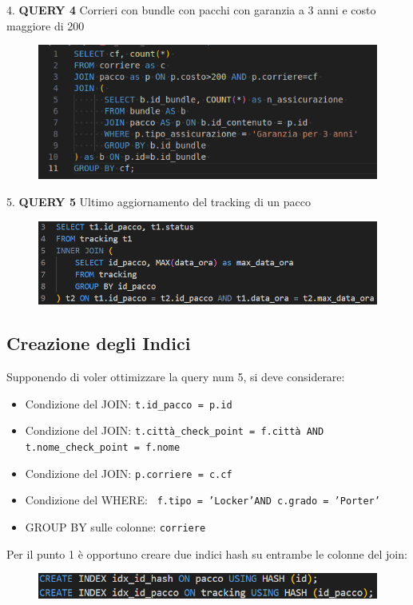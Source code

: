 4. \textbf{QUERY 4} Corrieri con bundle con pacchi con garanzia a 3 anni e costo maggiore di 200
\begin{figure}[H]
\centering
\includegraphics[width=0.7 \textwidth]{Resources/QUERY4.png}
\label{Q4}
\end{figure} 
5. \textbf{QUERY 5} Ultimo aggiornamento del tracking di un pacco
\begin{figure}[H]
\centering
\includegraphics[width=0.7 \textwidth]{Resources/QUERY5.png}
\label{Q5}
\end{figure}

\subsection{Creazione degli Indici} 

Supponendo di voler ottimizzare la query num 5, si deve considerare:

\begin{itemize}
  \item Condizione del JOIN: \texttt{t.id\_pacco = p.id}
  \item Condizione del JOIN: \texttt{t.città\_check\_point = f.città AND t.nome\_check\_point = f.nome}
  \item Condizione del JOIN: \texttt{p.corriere = c.cf}
  \item Condizione del WHERE: \texttt{ f.tipo = 'Locker'AND c.grado = 'Porter'}
  \item GROUP BY sulle colonne: \texttt{corriere}
\end{itemize}


\noindent Per il punto 1 è opportuno creare due indici hash su entrambe le colonne del join:
\begin{figure}[H]
\centering
\includegraphics[width=0.8 \textwidth]{Resources/INDEX1.png}
\label{I1}
\end{figure}

